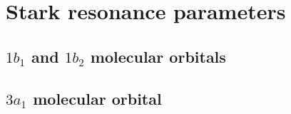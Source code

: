 
\section{Stark resonance parameters}
\label{ch:stark_params}
\subsection{$1b_{1}$ and $1b_{2}$ molecular orbitals}
\subsection{$3a_{1}$ molecular orbital}

